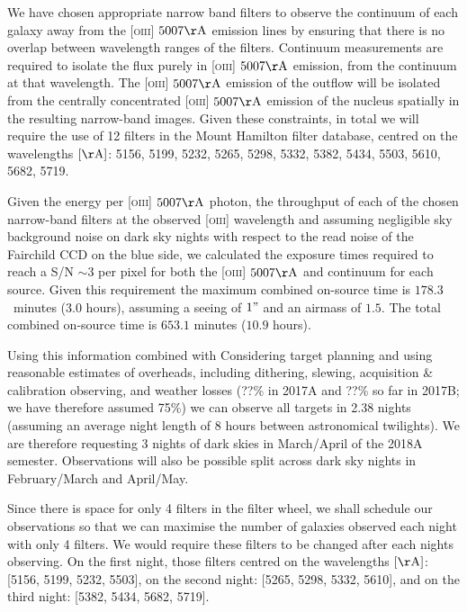 \documentclass[12pt]{article}
\begin{document}
We have chosen appropriate narrow band filters to observe the continuum of each galaxy away from the \textsc{[oiii]} $5007\rm{\AA}$ emission lines by ensuring that there is no overlap between wavelength ranges of the filters.  Continuum measurements are required to isolate the flux purely in \textsc{[oiii]} $5007\rm{\AA}$ emission, from the continuum at that wavelength. The \textsc{[oiii]} $5007\rm{\AA}$ emission of the outflow will be isolated from the centrally concentrated \textsc{[oiii]} $5007\rm{\AA}$ emission of the nucleus spatially in the resulting narrow-band images. Given these constraints, in total we will require the use of 12 filters in the Mount Hamilton filter database, centred on the wavelengths $[\rm{\AA}]$: 5156, 5199, 5232, 5265, 5298, 5332, 5382, 5434, 5503, 5610, 5682, 5719. 

\vspace{0.25em}

Given the energy per \textsc{[oiii]} $5007\rm{\AA}$ photon, the throughput of each of the chosen narrow-band filters at the observed \textsc{[oiii]} wavelength and assuming negligible sky background noise on dark sky nights with respect to the read noise of the Fairchild CCD on the blue side, we calculated the exposure times required to reach a S/N $\sim 3$ per pixel for both the \textsc{[oiii]} $5007\rm{\AA}$ and continuum for each source. Given this requirement the maximum combined on-source time is $178.3$~minutes ($3.0$ hours), assuming a seeing of $1"$ and an airmass of $1.5$. The total combined on-source time is $653.1$ minutes ($10.9$ hours).  
\vspace{0.25em}

Using this information combined with Considering target planning and using reasonable estimates of overheads, including dithering, slewing, acquisition \& calibration observing, and weather losses (??\% in 2017A and ??\% so far in 2017B; we have therefore assumed 75\%) we can observe all targets in 2.38 nights (assuming an average night length of $8$ hours between astronomical twilights). We are therefore requesting 3 nights of dark skies in March/April of the 2018A semester. Observations will also be possible split across dark sky nights in February/March and April/May.

Since there is space for only 4 filters in the filter wheel, we shall schedule our observations so that we can maximise the number of galaxies observed each night with only 4 filters. We would require these filters to be changed after each nights observing.  On the first night, those filters centred on the wavelengths $[\rm{\AA}]$: [5156, 5199, 5232, 5503], on the second night: [5265, 5298, 5332, 5610], and on the third night: [5382, 5434, 5682, 5719]. 
\end{document}
